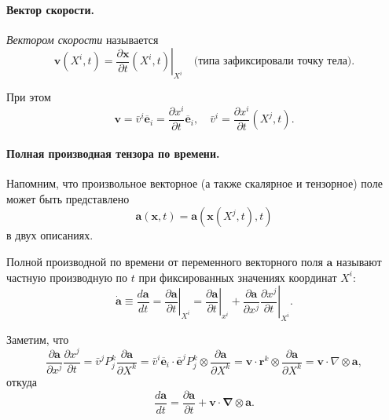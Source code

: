 \paragraph{Вектор скорости.}
\begin{definition*}
  \emph{Вектором скорости} называется
\begin{equation*}
\mathbf{v}\left(X^{i}, t\right)=\left.\frac{\partial \mathbf{x}}{\partial
t}\left(X^{i}, t\right)\right|_{X^{i}} \quad \text{(типа зафиксировали точку
тела)}.
\end{equation*}
\end{definition*}

При этом
\begin{equation*}
\mathbf{v}=\bar{v}^{i} \overline{\mathbf{e}}_{i}=\frac{\partial x^{i}}{\partial
t} \overline{\mathbf{e}}_{i}, \quad \bar{v}^{i}=\frac{\partial x^{i}}{\partial
t}\left(X^{j}, t\right).
\end{equation*}


\paragraph{Полная производная тензора по времени.} Напомним, что
произвольное векторное (а также скалярное и тензорное) поле может быть
представлено
\begin{equation*}
\mathbf{a}(\mathbf{x}, t)=\mathbf{a}\left(\mathbf{x}\left(X^{j}, t\right), t\right)
\end{equation*}
в двух описаниях.

\begin{definition*}
  Полной производной по времени от переменного векторного поля $ \mathbf{a} $
  называют частную производную по $t$ при фиксированных значениях координат
  $X^{i}$:
\begin{equation*}
\dot{\mathbf{a}} \equiv \frac{d \mathbf{a}}{d t}=\left.\frac{\partial
  \mathbf{a}}{\partial t}\right|_{X^{i}} = \left.\frac{\partial
    \mathbf{a}}{\partial t}\right|_{x^{i}}+\left.\frac{\partial
  \mathbf{a}}{\partial x^{j}} \frac{\partial x^{j}}{\partial t}\right|_{X^{i}}.
\end{equation*}
\end{definition*}

Заметим, что
\begin{equation*}
\frac{\partial \mathbf{a}}{\partial x^{j}} \frac{\partial x^{j}}{\partial
t}=\bar{v}^{j} P_{j}^{k} \frac{\partial \mathbf{a}}{\partial X^{k}}=\bar{v}^{i}
\overline{\mathbf{e}}_{i} \cdot \overline{\mathbf{e}}^{j} P_{j}^{k} \otimes
\frac{\partial \mathbf{a}}{\partial X^{k}}=\mathbf{v} \cdot \mathbf{r}^{k}
\otimes \frac{\partial \mathbf{a}}{\partial X^{k}}=\mathbf{v} \cdot \nabla
\otimes \mathbf{a},
\end{equation*}
откуда
\begin{equation*}
\frac{d \mathbf{a}}{d t}=\frac{\partial \mathbf{a}}{\partial t}+\mathbf{v} \cdot
\boldsymbol{\nabla} \otimes \mathbf{a}.
\end{equation*}

